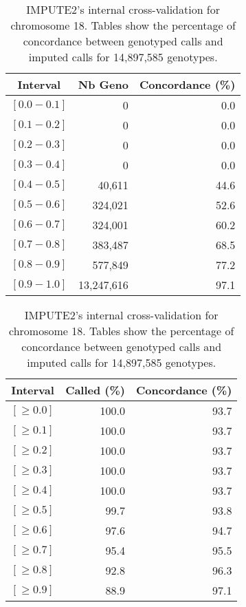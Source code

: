 \documentclass[10pt,twoside,english]{scrartcl}
\begin{document}
\begin{table}[H]
\protect\caption{IMPUTE2's internal cross-validation for chromosome 18. Tables show the
percentage of concordance between genotyped calls and imputed calls
for 14,897,585 genotypes.\label{tab:cross_validation_chr_18}}

\centering

\begin{tabular}{crr}
\hline 
\multicolumn{1}{c}{\textbf{Interval}}
 & \multicolumn{1}{c}{\textbf{Nb Geno}}
 & \multicolumn{1}{c}{\textbf{Concordance (\%)}}
\\
\hline 

$[0.0-0.1]$ & 0 & 0.0\\
$[0.1-0.2]$ & 0 & 0.0\\
$[0.2-0.3]$ & 0 & 0.0\\
$[0.3-0.4]$ & 0 & 0.0\\
$[0.4-0.5]$ & 40,611 & 44.6\\
$[0.5-0.6]$ & 324,021 & 52.6\\
$[0.6-0.7]$ & 324,001 & 60.2\\
$[0.7-0.8]$ & 383,487 & 68.5\\
$[0.8-0.9]$ & 577,849 & 77.2\\
$[0.9-1.0]$ & 13,247,616 & 97.1\\
\hline 
\end{tabular}
\hfill
\begin{tabular}{crr}
\hline 
\multicolumn{1}{c}{\textbf{Interval}}
 & \multicolumn{1}{c}{\textbf{Called (\%)}}
 & \multicolumn{1}{c}{\textbf{Concordance (\%)}}
\\
\hline 

$[\geq 0.0]$ & 100.0 & 93.7\\
$[\geq 0.1]$ & 100.0 & 93.7\\
$[\geq 0.2]$ & 100.0 & 93.7\\
$[\geq 0.3]$ & 100.0 & 93.7\\
$[\geq 0.4]$ & 100.0 & 93.7\\
$[\geq 0.5]$ & 99.7 & 93.8\\
$[\geq 0.6]$ & 97.6 & 94.7\\
$[\geq 0.7]$ & 95.4 & 95.5\\
$[\geq 0.8]$ & 92.8 & 96.3\\
$[\geq 0.9]$ & 88.9 & 97.1\\
\hline 
\end{tabular}


\end{table}
\end{document}
